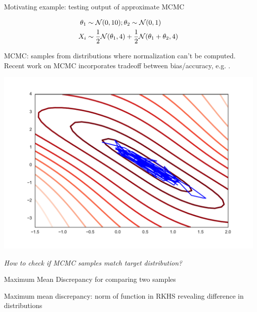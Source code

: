 

\begin{frame}
\begin{columns}
\begin{column}{.33\linewidth}
\begin{block}{Motivating example: testing output of approximate MCMC}
\begin{minipage}{.49\linewidth}

\begin{align*}
 \theta_{1}&\sim{\cal N}(0,10);\theta_{2}\sim{\cal N}(0,1) \\
 X_{i} &\sim\frac{1}{2}{\cal N}(\theta_{1},4)+\frac{1}{2}{\cal N}(\theta_{1}+\theta_{2},4)
\end{align*}
 \vspace{1cm} 


MCMC: samples from distributions where normalization can't be computed.
Recent work on MCMC  incorporates tradeoff between bias/accuracy, e.g. \cite{korattikara2013austerity}.
\end{minipage}
\begin{minipage}{.4\linewidth}
\includegraphics[scale=0.7]{../../presentation/img/sgld_trace_and_density.pdf}
\end{minipage}
\vspace{1cm}
\begin{center}
\Large
\emph{How to check if MCMC samples match target distribution?}
\end{center}
\end{block}
\vspace{-0.75cm}  %
\begin{block}{Maximum Mean Discrepancy for comparing two samples}
\begin{center}Maximum mean discrepancy: norm of function in RKHS revealing difference in distributions\end{center}
\begin{minipage}{.60\linewidth}


\end{minipage}
\end{block}
\end{column}
\end{columns}
\end{frame}
